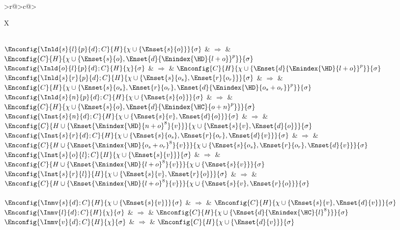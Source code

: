 \begin{xltabular}{\linewidth}{>{\scriptsize\raggedleft\arraybackslash}r@{\;}>{\scriptsize}c@{\;}>{\scriptsize\raggedright\arraybackslash}X}
	\midrule
	 \\

	${\Enconfig{\Inld{s}{l}{p}{d}; C}{H}{\chi\cup\{\Enset{s}{o}\}}{\sigma}}$ & $\Rightarrow$ & ${\Enconfig{C}{H}{\chi\cup\{\Enset{s}{o},\Enset{d}{\Enindex{\HD}{l+o}}^p\}}{\sigma}}$ \\
	${\Enconfig{\Inld{o}{l}{p}{d}; C}{H}{\chi}{\sigma}}$ & $\Rightarrow$ & ${\Enconfig{C}{H}{\chi\cup\{\Enset{d}{\Enindex{\HD}{l+o}}^p\}}{\sigma}}$ \\
	${\Enconfig{\Inld{s}{r}{p}{d}; C}{H}{\chi\cup\{\Enset{s}{o_s},\Enset{r}{o_r}\}}{\sigma}}$ & $\Rightarrow$ & ${\Enconfig{C}{H}{\chi\cup\{\Enset{s}{o_s},\Enset{r}{o_r},\Enset{d}{\Enindex{\HD}{o_s+o_r}}^p\}}{\sigma}}$ \\
	${\Enconfig{\Inld{s}{n}{p}{d}; C}{H}{\chi\cup\{\Enset{s}{o}\}}{\sigma}}$ & $\Rightarrow$ & ${\Enconfig{C}{H}{\chi\cup\{\Enset{s}{o},\Enset{d}{\Enindex{\HC}{o+n}^p}\}}{\sigma}}$ \\
	${\Enconfig{\Inst{s}{n}{d}; C}{H}{\chi\cup\{\Enset{s}{v},\Enset{d}{o}\}}{\sigma}}$ & $\Rightarrow$ & ${\Enconfig{C}{H\cup\{\Enset{\Enindex{\HD}{n+o}^8}{v}\}}{\chi\cup\{\Enset{s}{v},\Enset{d}{o}\}}{\sigma}}$ \\
	${\Enconfig{\Inst{s}{r}{d}; C}{H}{\chi\cup\{\Enset{s}{o_s},\Enset{r}{o_r},\Enset{d}{v}\}}{\sigma}}$ & $\Rightarrow$ & ${\Enconfig{C}{H\cup\{\Enset{\Enindex{\HD}{o_s+o_r}^8}{v}\}}{\chi\cup\{\Enset{s}{o_s},\Enset{r}{o_r},\Enset{d}{v}\}}{\sigma}}$ \\
	${\Enconfig{\Inst{s}{o}{l}; C}{H}{\chi\cup\{\Enset{s}{v}\}}{\sigma}}$ & $\Rightarrow$ & ${\Enconfig{C}{H\cup\{\Enset{\Enindex{\HD}{l+o}^8}{v}\}}{\chi\cup\{\Enset{s}{v}\}}{\sigma}}$ \\
	${\Enconfig{\Inst{s}{r}{l}}{H}{\chi\cup\{\Enset{s}{v},\Enset{r}{o}\}}{\sigma}}$ & $\Rightarrow$ & ${\Enconfig{C}{H\cup\{\Enset{\Enindex{\HD}{l+o}^8}{v}\}}{\chi\cup\{\Enset{s}{v},\Enset{r}{o}\}}{\sigma}}$ \\

	\midrule
	 \\

	${\Enconfig{\Inmv{s}{d}; C}{H}{\chi\cup\{\Enset{s}{v}\}}{\sigma}}$ & $\Rightarrow$ & ${\Enconfig{C}{H}{\chi\cup\{\Enset{s}{v},\Enset{d}{v}\}}{\sigma}}$ \\
	${\Enconfig{\Inmv{l}{d}; C}{H}{\chi}{\sigma}}$ & $\Rightarrow$ & ${\Enconfig{C}{H}{\chi\cup\{\Enset{d}{\Enindex{\HC}{l}^8}\}}{\sigma}}$ \\
	${\Enconfig{\Inmv{v}{d}; C}{H}{\chi}{\sigma}}$ & $\Rightarrow$ & ${\Enconfig{C}{H}{\chi\cup\{\Enset{d}{v}\}}{\sigma}}$ \\

	\bottomrule

	\caption{Operational semantics for the NASM.}
	\label{table:nstar-nsam-core-opsemantics}
\end{xltabular}

\endgroup

\clearpage

\endgroup
